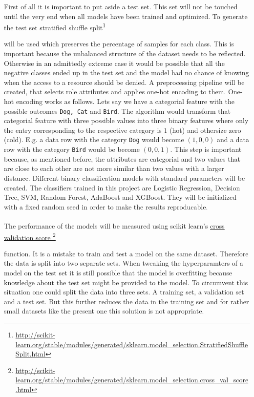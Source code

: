 \documentclass[11pt]{article}
\newcommand\fnurl[2]{%
\href{#2}{#1}\footnote{\url{#2}}%
}
\begin{document}
First of all it is important to put aside a test set. This set will not be 
touched until the very end when all models have been trained and optimized. 
To generate the test set
\fnurl{stratified shuffle split}{http://scikit-learn.org/stable/modules/generated/sklearn.model_selection.StratifiedShuffleSplit.html}  
will be used which preserves the percentage of samples for each class. This is
important because the unbalanced structure of the dataset needs to be reflected.
Otherwise in an admittedly extreme case it would be possible that all the negative
classes ended up in the test set and the model had no chance of knowing when the
access to a resource should be denied.
A preprocessing pipeline will be created, that selects role attributes and applies
one-hot encoding to them. One-hot encoding works as follows. Lets say we
have a categorial feature with the possible outcomes  
{\tt Dog, Cat} and {\tt Bird}. The algorithm 
would transform that categorial feature with three possible values into 
three binary features where only the entry corresponding to the respective
category is $1$ (hot) and othersize zero (cold). E.g. a data row with the
category {\tt Dog} would become $(1, 0, 0)$ and a data row with the category
{\tt Bird} would be become $(0, 0, 1)$.
This step is important because, as mentioned before,
the attributes are categorial and two values that are close to each other are not
more similar than two values with a larger distance.
Different binary classification models with standard parameters will be created.
The classifiers trained in this project are Logistic Regression, 
Decision Tree, SVM, Random Forest, AdaBoost and XGBoost.
They will be initialized with a fixed random seed in order to make the results reproducable.
\\ \\
The performance of the models will be measured using scikit learn's 
\fnurl{cross validation score }{http://scikit-learn.org/stable/modules/generated/sklearn.model_selection.cross_val_score.html}
function.
It is a mistake to train and test a model on the same dataset. 
Therefore the data is split into two separate sets.
When tweaking the hyperparamters of a model on the test set it is still
possible that the model is overfitting because knowledge about the test set
might be provided to the model. To circumvent this situation one could split
the data into three sets. A training set, a validation set and a test set.
But this further reduces the data in the training set 
and for rather small datasets like the present one this solution is not appropriate.
\end{document}

